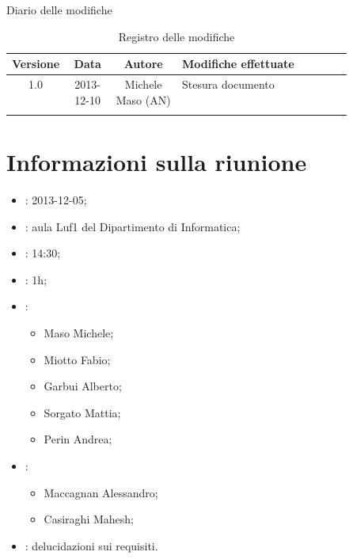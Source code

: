 
\newpage
Diario delle modifiche
\begin{center}
\begin{longtable}{|c|c|c|p{0.5\linewidth}|}
\toprule
\textbf{Versione} & \textbf{Data} & \textbf{Autore} & \textbf{Modifiche effettuate}\\


\midrule
1.0 & 2013-12-10 & Michele Maso (AN) & Stesura documento\\

\bottomrule
\caption{Registro delle modifiche}
\label{tab:changelog}
\end{longtable}
\end{center}

\newpage
\tableofcontents


\newpage
\section{Informazioni sulla riunione}%
\label{1.0}
\begin{itemize}
\item {}: 2013-12-05;
\item {}: aula Luf1 del Dipartimento di Informatica;
\item {}: 14:30;
\item {}: 1h;
\item {}: \NomeGruppo{}
\begin{itemize}
\item Maso Michele;
\item Miotto Fabio;
\item Garbui Alberto;
\item Sorgato Mattia;
\item Perin Andrea;
\end{itemize}
\item {}: \Prop{}
\begin{itemize}
\item Maccagnan Alessandro;
\item Casiraghi Mahesh;
\end{itemize}
\item {}: delucidazioni sui requisiti.
\end{itemize}

